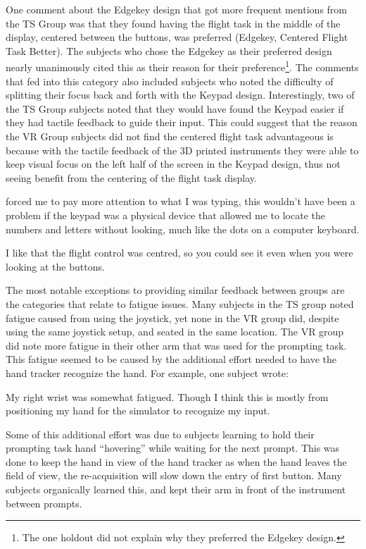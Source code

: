 One comment about the Edgekey design that got more frequent mentions from the TS Group was that they found having the flight task in the middle of the display, centered between the buttons, was preferred (Edgekey, Centered Flight Task Better).
The subjects who chose the Edgekey as their preferred design nearly unanimously cited this as their reason for their preference\footnote{The one holdout did not explain why they preferred the Edgekey design.}.
The comments that fed into this category also included subjects who noted the difficulty of splitting their focus back and forth with the Keypad design.
Interestingly, two of the TS Group subjects noted that they would have found the Keypad easier if they had tactile feedback to guide their input.
This could suggest that the reason the VR Group subjects did not find the centered flight task advantageous is because with the tactile feedback of the 3D printed instruments they were able to keep visual focus on the left half of the screen in the Keypad design, thus not seeing benefit from the centering of the flight task display.
\begin{displayquote}[TS Subject]
     forced me to pay more attention to what I was typing, this wouldn't have been a problem if the keypad was a physical device that allowed me to locate the numbers and letters without looking, much like the dots on a computer keyboard.
\end{displayquote}
\begin{displayquote}[VR Subject]
    I like that the flight control was centred, so you could see it even when you were looking at the buttons.
\end{displayquote}

The most notable exceptions to providing similar feedback between groups are the categories that relate to fatigue issues.
Many subjects in the TS group noted fatigue caused from using the joystick, yet none in the VR group did, despite using the same joystick setup, and seated in the same location.
The VR group did note more fatigue in their other arm that was used for the prompting task.
This fatigue seemed to be caused by the additional effort needed to have the hand tracker recognize the hand.
For example, one subject wrote:
\begin{displayquote}[VR Subject]
    My right wrist was somewhat fatigued.  Though I think this is mostly from positioning my hand for the simulator to recognize my input.
\end{displayquote}
Some of this additional effort was due to subjects learning to hold their prompting task hand ``hovering'' while waiting for the next prompt.
This was done to keep the hand in view of the hand tracker as when the hand leaves the field of view, the re-acquisition will slow down the entry of first button.
Many subjects organically learned this, and kept their arm in front of the instrument between prompts.

